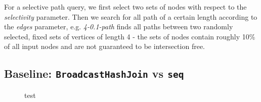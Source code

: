 For a selective path query, we first select two sets of nodes with respect to the \textit{selectivity} parameter.
Then we search for all path of a certain length according to the \textit{edges} parameter, e.g. \textit{4-0.1-path} finds all
paths between two randomly selected, fixed sets of vertices of length 4 - the sets of nodes contain roughly 10\% of all input nodes and are not guaranteed to be intersection free.

\subsection{Baseline: \texttt{BroadcastHashJoin} vs \texttt{seq}}

\begin{figure}
    \centering
    
    \caption{test}
    \label{TODO}
\end{figure}









